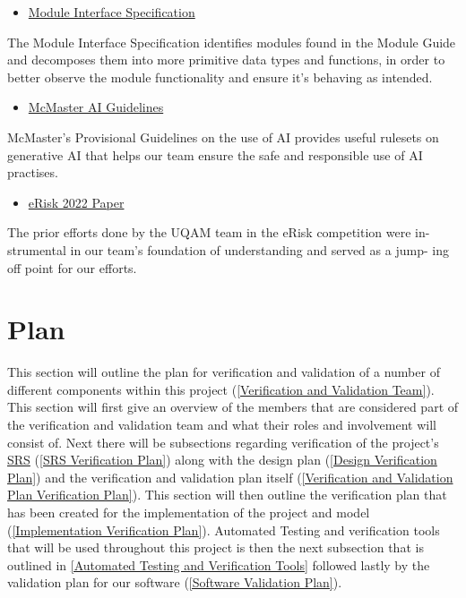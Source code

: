 \documentclass[12pt, titlepage]{article}
\begin{document}
\begin{itemize}
	\item \href{https://github.com/MichaelBreau/nlp-mentalhealth/blob/main/docs/Design/SoftDetailedDes/MIS.pdf}{Module Interface Specification}
\end{itemize}
The Module Interface Specification identifies modules found in the Module
Guide and decomposes them into more primitive data types and functions,
in order to better observe the module functionality and ensure it’s behaving
as intended.

\begin{itemize}
	\item \href{https://mi.mcmaster.ca/generative-artificial-intelligence-in-teaching-and-learning/#tab-content-provisional-guidelines}{McMaster AI Guidelines}
\end{itemize}
McMaster’s Provisional Guidelines on the use of AI provides useful rulesets
on generative AI that helps our team ensure the safe and responsible use of
AI practises.

\begin{itemize}
	\item \href{https://ceur-ws.org/Vol-3180/paper-74.pdf}{eRisk 2022 Paper}
\end{itemize}
The prior efforts done by the UQAM team in the eRisk competition were in-
strumental in our team’s foundation of understanding and served as a jump-
ing off point for our efforts.
\section{Plan}

This section will outline the plan for verification and validation of a number of different components within this project  (\ref{Verification and Validation Team}). This section will first give an overview of the members that are considered part of the verification and validation team and what their roles and involvement will consist of. Next there will be subsections regarding verification of the project's \href{https://github.com/MichaelBreau/nlp-mentalhealth/blob/main/docs/SRS/index.pdf}{SRS} (\ref{SRS Verification Plan}) along with the design plan (\ref{Design Verification Plan}) and the verification and validation plan itself (\ref{Verification and Validation Plan Verification Plan}). This section will then outline the verification plan that has been created for the implementation of the project and model (\ref{Implementation Verification Plan}). Automated Testing and verification tools that will be used throughout this project is then the next subsection that is outlined in \ref{Automated Testing and Verification Tools} followed lastly by the validation plan for our software (\ref{Software Validation Plan}).
  
\end{document}
